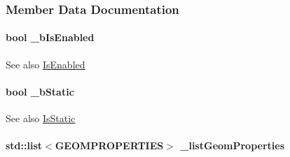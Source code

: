 \subsubsection{Member Data Documentation}
\hypertarget{classOpenRAVE_1_1KinBody_1_1Link_af3bf3d9314227021700269eb8eff8359}{
\paragraph[{\_\-bIsEnabled}]{\setlength{\rightskip}{0pt plus 5cm}bool {\bf \_\-bIsEnabled}}\hfill}
\label{classOpenRAVE_1_1KinBody_1_1Link_af3bf3d9314227021700269eb8eff8359}
\begin{DoxySeeAlso}{See also}
\hyperlink{classOpenRAVE_1_1KinBody_1_1Link_ab093c91e2859f12d929fe8665e67a8e8}{IsEnabled} 
\end{DoxySeeAlso}
\hypertarget{classOpenRAVE_1_1KinBody_1_1Link_ae7605f811744b718329556c2399ee430}{
\paragraph[{\_\-bStatic}]{\setlength{\rightskip}{0pt plus 5cm}bool {\bf \_\-bStatic}}\hfill}
\label{classOpenRAVE_1_1KinBody_1_1Link_ae7605f811744b718329556c2399ee430}
\begin{DoxySeeAlso}{See also}
\hyperlink{classOpenRAVE_1_1KinBody_1_1Link_a3578d5b29398025138bfed3ef1e99558}{IsStatic} 
\end{DoxySeeAlso}
\hypertarget{classOpenRAVE_1_1KinBody_1_1Link_ab6b7d1c39509f8a533583eb6b185418d}{
\paragraph[{\_\-listGeomProperties}]{\setlength{\rightskip}{0pt plus 5cm}std::list$<${\bf GEOMPROPERTIES}$>$ {\bf \_\-listGeomProperties}}\hfill}
